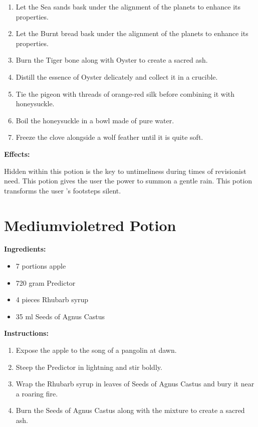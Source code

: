 \documentclass{article}
\begin{document}
\begin{enumerate}
  \item Let the Sea sands bask under the alignment of the planets to enhance its properties.
  \item Let the Burnt bread bask under the alignment of the planets to enhance its properties.
  \item Burn the Tiger bone along with Oyster to create a sacred ash.
  \item Distill the essence of Oyster delicately and collect it in a crucible.
  \item Tie the pigeon with threads of orange-red silk before combining it with honeysuckle.
  \item Boil the honeysuckle in a bowl made of pure water.
  \item Freeze the clove alongside a wolf feather until it is quite soft.
\end{enumerate}

\textbf{Effects:}

Hidden within this potion is the key to untimeliness during times of revisionist need. This potion gives the user the power to summon a gentle rain. This potion transforms the user 's footsteps silent.

\newpage
\section*{Mediumvioletred Potion}

\textbf{Ingredients:}

\begin{itemize}
  \item 7 portions apple
  \item 720 gram Predictor
  \item 4 pieces Rhubarb syrup
  \item 35 ml Seeds of Agnus Castus
\end{itemize}

\textbf{Instructions:}

\begin{enumerate}
  \item Expose the apple to the song of a pangolin at dawn.
  \item Steep the Predictor in lightning and stir boldly.
  \item Wrap the Rhubarb syrup in leaves of Seeds of Agnus Castus and bury it near a roaring fire.
  \item Burn the Seeds of Agnus Castus along with the mixture to create a sacred ash.
\end{enumerate}
\end{document}
